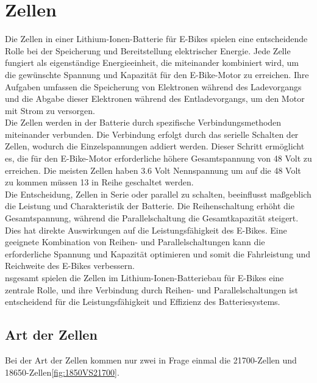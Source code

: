 \section{Zellen}
Die Zellen in einer Lithium-Ionen-Batterie für E-Bikes spielen eine entscheidende Rolle bei der Speicherung und Bereitstellung elektrischer Energie. Jede Zelle fungiert als eigenständige Energieeinheit, die miteinander kombiniert wird, um die gewünschte Spannung und Kapazität für den E-Bike-Motor zu erreichen. Ihre Aufgaben umfassen die Speicherung von Elektronen während des Ladevorgangs und die Abgabe dieser Elektronen während des Entladevorgangs, um den Motor mit Strom zu versorgen.\\

Die Zellen werden in der Batterie durch spezifische Verbindungsmethoden miteinander verbunden. Die Verbindung erfolgt durch das serielle Schalten der Zellen, wodurch die Einzelspannungen addiert werden. Dieser Schritt ermöglicht es, die für den E-Bike-Motor erforderliche höhere Gesamtspannung von 48 Volt zu erreichen. Die meisten Zellen haben 3.6 Volt Nennspannung um auf die 48 Volt zu kommen müssen 13 in Reihe geschaltet werden.\\

Die Entscheidung, Zellen in Serie oder parallel zu schalten, beeinflusst maßgeblich die Leistung und Charakteristik der Batterie. Die Reihenschaltung erhöht die Gesamtspannung, während die Parallelschaltung die Gesamtkapazität steigert. Dies hat direkte Auswirkungen auf die Leistungsfähigkeit des E-Bikes. Eine geeignete Kombination von Reihen- und Parallelschaltungen kann die erforderliche Spannung und Kapazität optimieren und somit die Fahrleistung und Reichweite des E-Bikes verbessern.\\

nsgesamt spielen die Zellen im Lithium-Ionen-Batteriebau für E-Bikes eine zentrale Rolle, und ihre Verbindung durch Reihen- und Parallelschaltungen ist entscheidend für die Leistungsfähigkeit und Effizienz des Batteriesystems.\\


\subsection{Art der Zellen}
Bei der Art der Zellen kommen nur zwei in Frage einmal die 21700-Zellen und 18650-Zellen\ref*{fig:1850VS21700}.

